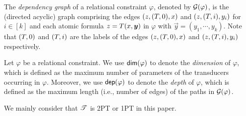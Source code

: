 {%
The \emph{dependency graph} of a relational constraint $\varphi$, denoted by $\mathcal{G}(\varphi)$, is the (directed acyclic) graph comprising the edges $(z, (T, 0), x)$ and $(z, (T, i), y_i)$ for $i\in [k]$ and  each atomic formula $z = \Transducer(x, \vec{y})$ in $\varphi$ with $\vec{y}=(y_1, \cdots, y_k)$. Note that $(T, 0)$ and $(T, i)$ are the labels of the edges $(z, (T, 0), x)$ and $(z, (T, i), y_i)$ respectively.

Let $\varphi$ be a relational constraint. We use $\mathsf{dim}(\varphi)$ to denote the \emph{dimension} of $\varphi$, which is defined as the maximum number of parameters of the transducers occurring in $\varphi$. Moreover, we use $\mathsf{dep}(\varphi)$ to denote the \emph{depth} of $\varphi$, which is defined as the maximum length (i.e., number of edges) of the paths in $\mathcal{G}(\varphi)$.
 
We mainly consider that $\mathscr{T}$ is 2PT or 1PT in this paper. 
}
